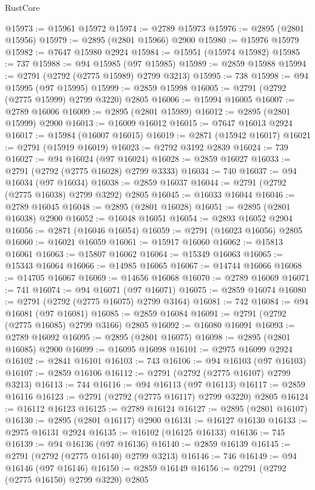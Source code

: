 \begin{lexlean}{RustCore}
\begin{coremodule}
@15973 := @15961 @15972
@15974 := @2789 @15973
@15976 := @2895 (@2801 @15956)
@15979 := @2895 (@2801 @15966) @2900
@15980 := @15976 @15979
@15982 := @7647 @15980 @2924
@15984 := @15951 (@15974 @15982)
@15985 := 737
@15988 := @94 @15985 (@97 @15985)
@15989 := @2859 @15988
@15994 := @2791 (@2792 (@2775 @15989) @2799 @3213)
@15995 := 738
@15998 := @94 @15995 (@97 @15995)
@15999 := @2859 @15998
@16005 := @2791 (@2792 (@2775 @15999) @2799 @3220) @2805
@16006 := @15994 @16005
@16007 := @2789 @16006
@16009 := @2895 (@2801 @15989)
@16012 := @2895 (@2801 @15999) @2900
@16013 := @16009 @16012
@16015 := @7647 @16013 @2924
@16017 := @15984 (@16007 @16015)
@16019 := @2871 (@15942 @16017)
@16021 := @2791 (@15919 @16019)
@16023 := @2792 @3192 @2839
@16024 := 739
@16027 := @94 @16024 (@97 @16024)
@16028 := @2859 @16027
@16033 := @2791 (@2792 (@2775 @16028) @2799 @3333)
@16034 := 740
@16037 := @94 @16034 (@97 @16034)
@16038 := @2859 @16037
@16044 := @2791 (@2792 (@2775 @16038) @2799 @3292) @2805
@16045 := @16033 @16044
@16046 := @2789 @16045
@16048 := @2895 (@2801 @16028)
@16051 := @2895 (@2801 @16038) @2900
@16052 := @16048 @16051
@16054 := @2893 @16052 @2904
@16056 := @2871 (@16046 @16054)
@16059 := @2791 (@16023 @16056) @2805
@16060 := @16021 @16059
@16061 := @15917 @16060
@16062 := @15813 @16061
@16063 := @15807 @16062
@16064 := @15349 @16063
@16065 := @15343 @16064
@16066 := @14985 @16065
@16067 := @14744 @16066
@16068 := @14705 @16067
@16069 := @14656 @16068
@16070 := @2789 @16069
@16071 := 741
@16074 := @94 @16071 (@97 @16071)
@16075 := @2859 @16074
@16080 := @2791 (@2792 (@2775 @16075) @2799 @3164)
@16081 := 742
@16084 := @94 @16081 (@97 @16081)
@16085 := @2859 @16084
@16091 := @2791 (@2792 (@2775 @16085) @2799 @3166) @2805
@16092 := @16080 @16091
@16093 := @2789 @16092
@16095 := @2895 (@2801 @16075)
@16098 := @2895 (@2801 @16085) @2900
@16099 := @16095 @16098
@16101 := @2975 @16099 @2924
@16102 := @2841 @16101
@16103 := 743
@16106 := @94 @16103 (@97 @16103)
@16107 := @2859 @16106
@16112 := @2791 (@2792 (@2775 @16107) @2799 @3213)
@16113 := 744
@16116 := @94 @16113 (@97 @16113)
@16117 := @2859 @16116
@16123 := @2791 (@2792 (@2775 @16117) @2799 @3220) @2805
@16124 := @16112 @16123
@16125 := @2789 @16124
@16127 := @2895 (@2801 @16107)
@16130 := @2895 (@2801 @16117) @2900
@16131 := @16127 @16130
@16133 := @2975 @16131 @2924
@16135 := @16102 (@16125 @16133)
@16136 := 745
@16139 := @94 @16136 (@97 @16136)
@16140 := @2859 @16139
@16145 := @2791 (@2792 (@2775 @16140) @2799 @3213)
@16146 := 746
@16149 := @94 @16146 (@97 @16146)
@16150 := @2859 @16149
@16156 := @2791 (@2792 (@2775 @16150) @2799 @3220) @2805

\end{coremodule}
\end{lexlean}
